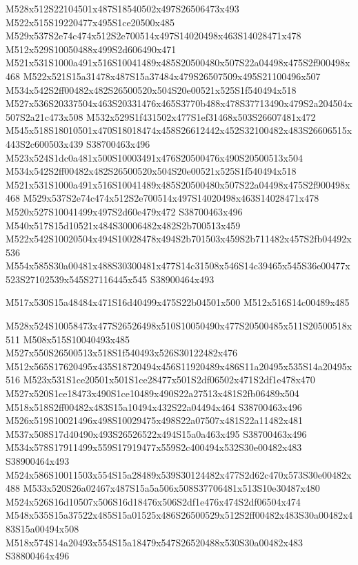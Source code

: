 \documentclass{article}
\begin{document}
\begin{multicols}{2}
M528x512S22104501x487S18540502x497S26506473x493 M522x515S19220477x495S1ce20500x485 M529x537S2e74c474x512S2e700514x497S14020498x463S14028471x478 M512x529S10050488x499S2d606490x471 M521x531S1000a491x516S10041489x485S20500480x507S22a04498x475S2f900498x468 M522x521S15a31478x487S15a37484x479S26507509x495S21100496x507 M534x542S2ff00482x482S26500520x504S20e00521x525S1f540494x518 M527x536S20337504x463S20331476x465S3770b488x478S37713490x479S2a204504x507S2a21c473x508 M532x529S1f431502x477S1ef31468x503S26607481x472 M545x518S18010501x470S18018474x458S26612442x452S32100482x483S26606515x443S2c600503x439 S38700463x496 M523x524S1dc0a481x500S10003491x476S20500476x490S20500513x504 M534x542S2ff00482x482S26500520x504S20e00521x525S1f540494x518 M521x531S1000a491x516S10041489x485S20500480x507S22a04498x475S2f900498x468 M529x537S2e74c474x512S2e700514x497S14020498x463S14028471x478 M520x527S10041499x497S2d60e479x472 S38700463x496 M540x517S15d10521x484S30006482x482S2b700513x459 M522x542S10020504x494S10028478x494S2b701503x459S2b711482x457S2fb04492x536 M554x585S30a00481x488S30300481x477S14c31508x546S14c39465x545S36e00477x523S27102539x545S27116445x545 S38900464x493


\begin{center}
M517x530S15a48484x471S16d40499x475S22b04501x500 M512x516S14c00489x485 
\end{center}




M528x524S10058473x477S26526498x510S10050490x477S20500485x511S20500518x511 M508x515S10040493x485 M527x550S26500513x518S1f540493x526S30122482x476 M512x565S17620495x435S18720494x456S11920489x486S11a20495x535S14a20495x516 M523x531S1ce20501x501S1ce28477x501S2df06502x471S2df1e478x470 M527x520S1ce18473x490S1ce10489x490S22a27513x481S2fb06489x504 M518x518S2ff00482x483S15a10494x432S22a04494x464 S38700463x496 M526x519S10021496x498S10029475x498S22a07507x481S22a11482x481 M537x508S17d40490x493S26526522x494S15a0a463x495 S38700463x496 M534x578S17911499x559S17919477x559S2c400494x532S30e00482x483 S38900464x493 M524x586S10011503x554S15a28489x539S30124482x477S2d62c470x573S30e00482x488 M533x520S26a02467x487S15a5a506x508S37706481x513S10e30487x480 M524x526S16d10507x506S16d18476x506S2df1e476x474S2df06504x474 M548x535S15a37522x485S15a01525x486S26500529x512S2ff00482x483S30a00482x483S15a00494x508 M518x574S14a20493x554S15a18479x547S26520488x530S30a00482x483 S38800464x496


\end{multicols}
\end{document}
